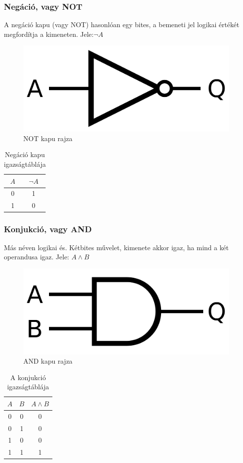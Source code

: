 \documentclass[
]{thesis-ekf}
\theoremstyle{definition}
\theoremstyle{remark}
\begin{document}
\subsubsection{Negáció, vagy NOT}
A negáció kapu (vagy NOT) hasonlóan egy bites, a bemeneti jel logikai értékét megfordítja a kimeneten. Jele:$\neg A$

\begin{figure}[H]
	\centering
	\includegraphics[width=0.3\linewidth]{not}
	\caption{NOT kapu rajza}
	\label{fig:not}
\end{figure}


\begin{table}[H]
	\centering
	\begin{tabular}{c|c}
		$A$ & $\neg A$\\
		\hline
		0 & 1\\
		1 & 0 
	\end{tabular}
	\caption{Negáció kapu igazságtáblája}
\end{table}

\subsubsection{Konjukció, vagy AND}
Más néven logikai és. Kétbites művelet, kimenete akkor igaz, ha mind a két operandusa igaz. Jele: $A \land B$

\begin{figure}[H]
	\centering
	\includegraphics[width=0.3\linewidth]{and}
	\caption{AND kapu rajza}
	\label{fig:and}
\end{figure}


\begin{table}[H]
	\centering
	\begin{tabular}{c|c|c}
		$A$ & $B$ & $A \land B$\\               
		\hline
		0 & 0 & 0\\
		0 & 1 & 0\\
		1 & 0 & 0\\
		1 & 1 & 1
	\end{tabular}
	\caption{A konjukció igazságtáblája}
\end{table}
\end{document}
